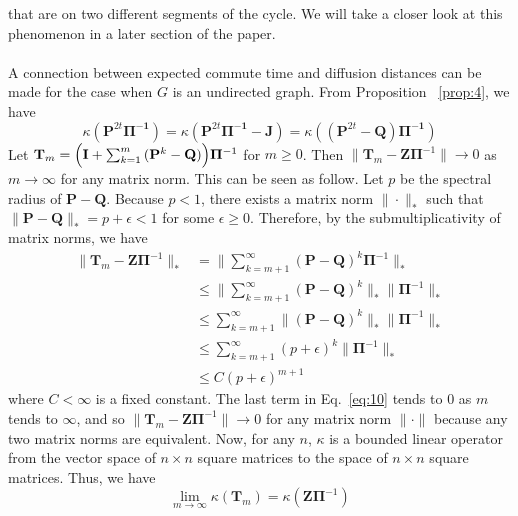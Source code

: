 \documentclass[10pt,twocolumn]{article}
\numberwithin{equation}{section}
\begin{document}
that are on two different segments of the cycle. We will take a closer
look at this phenomenon in a later section of the paper.  \\ \\
\noindent
A connection between expected commute time and diffusion distances can
be made for the case when $G$ is an undirected graph. From Proposition
~\ref{prop:4}, we have
\begin{equation*}
\kappa(\mathbf{P}^{2t}\bm{\Pi^{-1}}) =
\kappa(\mathbf{P}^{2t}\bm{\Pi^{-1}} - \mathbf{J}) =
\kappa((\mathbf{P}^{2t} - \mathbf{Q}) \bm{\Pi^{-1}})
\end{equation*}
Let $\mathbf{T}_{m} = \Bigl(\mathbf{I} + \sum_{k =
  1}^{m}{(\mathbf{P}^{k} - \mathbf{Q})}\Bigr)\bm{\Pi}^{-1}$ for $m
\geq 0$. Then $\| \mathbf{T}_m - \mathbf{Z}\bm{\Pi}^{-1} \| \rightarrow 0$ as
$m \rightarrow \infty$ for any matrix norm. This can be seen as
follow. Let $p$ be the spectral radius of
$\mathbf{P} - \mathbf{Q}$. Because $p < 1$, there exists a matrix norm
$\| \cdot \|_*$ such that $\| \mathbf{P} - \mathbf{Q} \|_* = p + \epsilon
< 1$ for some $\epsilon \geq 0$. Therefore, by the submultiplicativity
of matrix norms, we have
\begin{equation}
  \label{eq:10}
  \begin{split}
  \| \mathbf{T}_m - \mathbf{Z}\bm{\Pi}^{-1} \|_* &=
  \|\sum_{k=m+1}^{\infty}(\mathbf{P} - \mathbf{Q})^{k}\bm{\Pi}^{-1}
    \|_* \\
   &\leq \| \sum_{k=m+1}^{\infty}(\mathbf{P} - \mathbf{Q})^{k} \|_*
   \|\bm{\Pi}^{-1} \|_* \\
   &\leq \sum_{k=m+1}^{\infty} \|(\mathbf{P} - \mathbf{Q})^{k} \|_* \|
   \bm{\Pi}^{-1} \|_* \\
    &\leq \sum_{k=m+1}^{\infty} (p+\epsilon)^{k} \| \bm{\Pi}^{-1} \|_* \\
    &\leq C (p+\epsilon)^{m+1}
  \end{split}
\end{equation}
where $C < \infty$ is a fixed constant. The last term in
Eq.~\eqref{eq:10} tends to $0$ as $m$ tends to $\infty$, and so $\|
\mathbf{T}_m - \mathbf{Z}\bm{\Pi}^{-1} \| \rightarrow 0$ for any
matrix norm $\| \cdot \|$ because any two matrix norms are
equivalent. Now, for any $n$, $\kappa$ is a bounded linear operator
from the vector space of $n \times n$ square matrices to the space of
$n \times n$ square matrices. Thus, we have
\begin{equation}
  \label{eq:15}
  \lim_{m \rightarrow \infty}\kappa(\mathbf{T}_m) =
    \kappa(\mathbf{Z}\bm{\Pi}^{-1})
\end{equation}
\end{document}

